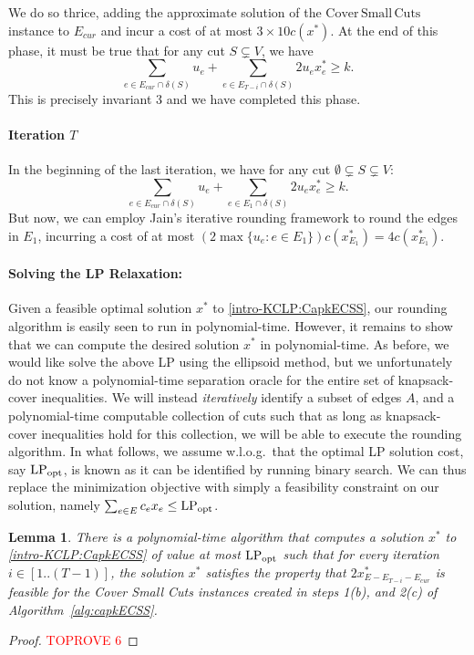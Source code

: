\documentclass[11pt]{article}
\newtheorem{lemma}[theorem]{Lemma}
\newcommand\lpopt{\hbox{\text{LP}$_{\text{opt}}$}}
\newcommand\ASC{\mathrm{Cover\,Small\,Cuts}}
\newcommand{\alphatwo}{2}
\begin{document}
{We do so thrice, adding the approximate solution
of the $\ASC$ instance to $E_{cur}$ and incur a cost of at most
$3\times 10c(x^*)$. At the end of this phase, it must be true that for any cut $S \subsetneq V$, we have
\[
\sum_{e\in E_{cur} \cap \delta(S)}u_e + \sum_{e\in E_{T-i} \cap \delta(S)}\alphatwo u_e x^*_e \geq k.
\]
This is precisely invariant 3 and we have completed this phase.

\paragraph{Iteration $T$}

In the beginning of the last iteration, we have for any cut $\emptyset \subsetneq S \subsetneq V$:
\[
\sum_{e\in E_{cur} \cap \delta(S)}u_e + \sum_{e\in E_{1} \cap \delta(S)}\alphatwo u_e x^*_e \geq k.
\]
But now, we can employ Jain's iterative rounding framework to round
the edges in $E_1$, incurring a cost of at most
$(2\max\{u_e: e\in E_1\})c(x^*_{E_1}) = 4c(x^*_{E_1})$.


\paragraph{Solving the LP Relaxation:} 
Given a feasible optimal solution $x^*$ to \eqref{intro-KCLP:CapkECSS}, our rounding algorithm is easily seen to run in polynomial-time. However, it remains to show that we can compute the desired solution  $x^*$ in polynomial-time.
As before, we would like solve the above LP using the ellipsoid method, but we unfortunately do not know a polynomial-time separation oracle for the entire set of knapsack-cover inequalities. We will instead {\em iteratively} identify a subset of edges $A$, and a polynomial-time computable collection of cuts such that as long as knapsack-cover inequalities hold for this collection, we will be able to execute the rounding algorithm. In what follows, we assume w.l.o.g.\ that the optimal LP solution cost, say $\lpopt$, is known as it can be identified by running binary search. We can thus replace the minimization objective with simply a feasibility constraint on our solution, namely $\sum_{e\in E}c_e x_e \leq \lpopt$.


\begin{lemma}\label{lem:polytimeKC_CapkECSS}
There is a polynomial-time algorithm that computes a solution $x^*$ to \eqref{intro-KCLP:CapkECSS} of value at most $\lpopt$ such that for every iteration $i \in [1..(T-1)]$, the solution $x^*$ satisfies the property that $2x^*_{E-E_{T-i} - E_{cur}}$ is feasible for the Cover Small Cuts instances created in steps 1(b), and 2(c) of Algorithm~\ref{alg:capkECSS}. 
\end{lemma}
\begin{proof}\textcolor{red}{TOPROVE 6}\end{proof}


}
\end{document}
